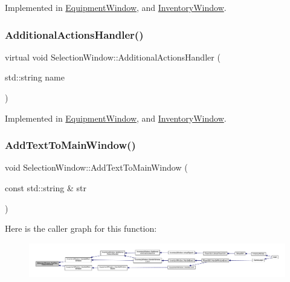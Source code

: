 Implemented in \mbox{\hyperlink{class_equipment_window_abfd5a25ea90203e21291d6c6725b30f2}{Equipment\+Window}}, and \mbox{\hyperlink{class_inventory_window_a184239af4739a83163b45c4bb72ff6ec}{Inventory\+Window}}.

\mbox{\label{class_selection_window_aaa0131b5b67dc5b3f7ebb85835cd31a7}} 
\subsubsection{\texorpdfstring{Additional\+Actions\+Handler()}{AdditionalActionsHandler()}}
{\footnotesize\ttfamily virtual void Selection\+Window\+::\+Additional\+Actions\+Handler (\begin{DoxyParamCaption}\item[{std\+::string}]{name }\end{DoxyParamCaption})\hspace{0.3cm}{\ttfamily [pure virtual]}}



Implemented in \mbox{\hyperlink{class_equipment_window_aa97046abad40cd1b4003fef694686992}{Equipment\+Window}}, and \mbox{\hyperlink{class_inventory_window_a5115f00fecccca34ba3559079a325a9a}{Inventory\+Window}}.

\mbox{\label{class_selection_window_aa423c4b3c042949c8c7edfec26355e95}} 
\subsubsection{\texorpdfstring{Add\+Text\+To\+Main\+Window()}{AddTextToMainWindow()}}
{\footnotesize\ttfamily void Selection\+Window\+::\+Add\+Text\+To\+Main\+Window (\begin{DoxyParamCaption}\item[{const std\+::string \&}]{str }\end{DoxyParamCaption})}

Here is the caller graph for this function\+:
\nopagebreak
\begin{figure}[H]
\begin{center}
\leavevmode
\includegraphics[width=350pt]{db/d9c/class_selection_window_aa423c4b3c042949c8c7edfec26355e95_icgraph}
\end{center}
\end{figure}
\mbox{\label{class_selection_window_a2a7aa65a4c77fce6f2a44a0d10b911eb}} 

